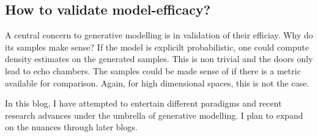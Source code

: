 \documentclass[twoside]{article}
\begin{document}
\subsection{How to validate model-efficacy?} %
\label{sub:how_to_validate}

A central concern to generative modelling is in validation of their efficiay. Why do its samples make sense? If the model is explicilt probabilistic, one could compute density estimates on the generated samples. This is non trivial and the doors only lead to echo chambers. The samples could be made sense of if there is a metric available for comparison. Again, for high dimensional spaces, this is not the case. 

In this blog, I have attempted to entertain different paradigms and recent research advances under the umbrella of generative modelling. I plan to expand on the nuances through later blogs.
\end{document}

